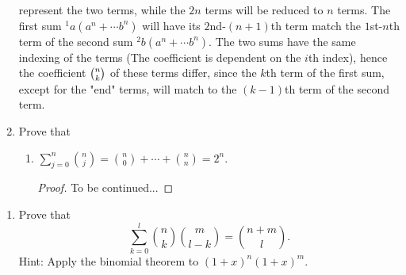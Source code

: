 \begin{exercise}[\textbf{3}]
\begin{enumerate}
\begin{remark}
         represent the two terms, while the $2n$ terms will be reduced to $n$
         terms. The first sum $^1 a(a^n+\dotsb b^n)$ will have its
         $2$nd-$(n+1)$th term match the $1$st-$n$th term of the second sum $^2
         b(a^n+\dotsb b^n)$. The two sums have the same indexing of the terms
         (The coefficient is dependent on the $i$th index), hence the coefficient
         $\tbinom{n}{k}$ of these terms differ, since the $k$th term of the
         first sum, except for the "end" terms, will match to the $(k-1)$th term
         of the second term.
         \end{remark}
         \item Prove that 
         \begin{enumerate}
             \item $\sum\limits_{j=0}^{n}\binom{n}{j}=\binom{n}{0}+\dotsb+\binom{n}{n}=2^n$.
             \begin{proof}To be continued...
                  
             \end{proof}
         \end{enumerate}
    \end{enumerate}
\begin{exercise}[$\vec{4}$] 
     \begin{enumerate} Prove the following:
         \item Prove that
         \begin{equation*}
             \sum\limits_{k=0}^{l}\binom{n}{k}\binom{m}{l-k}=\binom{n+m}{l}.
         \end{equation*}
         Hint: Apply the binomial theorem to $(1+x)^n(1+x)^m$.


\end{enumerate}
\end{exercise}
\end{exercise}
